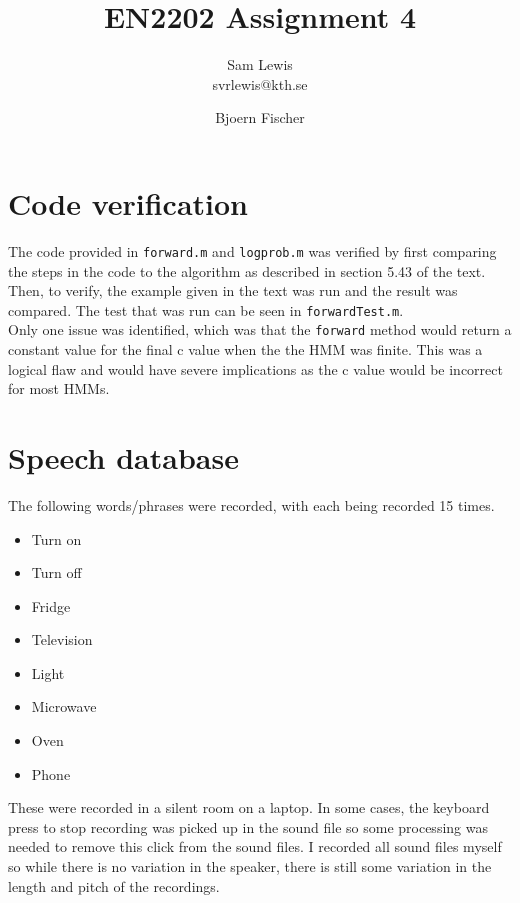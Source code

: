 \documentclass[11pt]{article}   %
\begin{document}
\setlength{\parindent}{0.00in}

\title{EN2202 Assignment 4}

\author{
 Sam Lewis\\
 svrlewis@kth.se
  \and
  Bjoern Fischer  
}
\date{} 
\maketitle
\linespread{1.5}

\section{Code verification}

The code provided in \texttt{forward.m} and \texttt{logprob.m} was verified by first comparing the steps in the code to the algorithm as described in section 5.43 of the text. Then, to verify, the example given in the text was run and the result was compared. The test that was run can be seen in \texttt{forwardTest.m}.\\

Only one issue was identified, which was that the \texttt{forward} method would return a constant value for the final c value when the the HMM was finite. This was a logical flaw and would have severe implications as the c value would be incorrect for most HMMs. 

\section{Speech database}

The following words/phrases were recorded, with each being recorded 15 times. 


\begin{itemize}
  \item Turn on
  \item Turn off
  \item Fridge
  \item Television
  \item Light
  \item Microwave
  \item Oven
  \item Phone
\end{itemize}

These were recorded in a silent room on a laptop. In some cases, the keyboard press to stop recording was picked up in the sound file so some processing was needed to remove this click from the sound files. I recorded all sound files myself so while there is no variation in the speaker, there is still some variation in the length and pitch of the recordings. 
\end{document}

